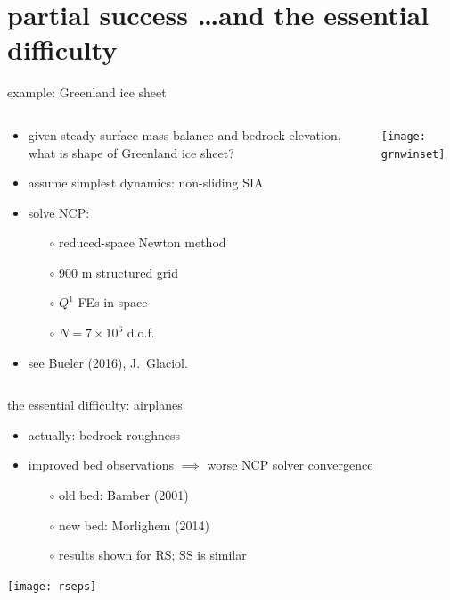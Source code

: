 \documentclass{beamer}
\begin{document}
\section{partial success \dots and the essential difficulty}

\begin{frame}{example: Greenland ice sheet}

\begin{columns}
\begin{column}{0.6\textwidth}
\begin{itemize}
\item given steady surface mass balance and bedrock elevation, what is shape of Greenland ice sheet?
\item assume simplest dynamics: non-sliding SIA
\item solve NCP:
  \begin{itemize}
  \item[$\circ$] reduced-space Newton method
  \item[$\circ$] 900 m structured grid
  \item[$\circ$] $Q^1$ FEs in space
  \item[$\circ$] $N=7\times 10^6$ d.o.f.
  \end{itemize}
\item see Bueler (2016), J.~Glaciol.
\end{itemize}
\end{column}
\begin{column}{0.4\textwidth}
\vspace{-5mm}

\begin{center}
\texttt{[image: grnwinset]}
\end{center}
\end{column}
\end{columns}
\end{frame}



\begin{frame}{the essential difficulty: airplanes}

\begin{itemize}
\item actually: \alert{bedrock roughness}
\item improved bed observations $\implies$ worse NCP solver convergence
  \begin{itemize}
  \item[$\circ$] old bed: Bamber (2001)
  \item[$\circ$] new bed: Morlighem (2014)
  \item[$\circ$] results shown for RS; SS is similar
  \end{itemize}
\end{itemize}

\begin{center}
\texttt{[image: rseps]}
\end{center}
\end{frame}
\end{document}
